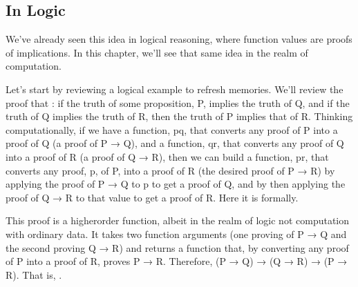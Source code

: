 \documentclass[letterpaper,10pt,english]{sphinxmanual}
\begin{document}
\subsection{In Logic}
\label{\detokenize{A_03_Recursive_Types:in-logic}}
\sphinxAtStartPar
We’ve already seen this idea in logical reasoning,
where function values are proofs of implications.
In this chapter, we’ll see that same idea in the
realm of computation.

\sphinxAtStartPar
Let’s start by reviewing a logical example to
refresh memories. We’ll review the proof that
: if the truth of some
proposition, P, implies the truth of Q, and if the
truth of Q implies the truth of R, then the truth
of P implies that of R. Thinking computationally,
if we have a function, pq, that converts any proof
of P into a proof of Q (a proof of P → Q), and a
function, qr, that converts any proof of Q into a
proof of R (a proof of Q → R), then we can build
a function, pr, that converts any proof, p, of P,
into a proof of R (the desired proof of P → R) by
applying the proof of P → Q to p to get a proof of
Q, and by then applying the proof of Q → R to that
value to get a proof of R. Here it is formally.

\begin{sphinxVerbatim}[commandchars=\\\{\}]
                  
     
        
    
\end{sphinxVerbatim}

\sphinxAtStartPar
This proof is a higher\sphinxhyphen{}order function, albeit in the
realm of logic not computation with ordinary data. It
takes two function arguments (one proving of P → Q and
the second proving Q → R) and returns a function that,
by converting any proof of P into a proof of R, proves
P → R. Therefore, (P → Q) → (Q → R) → (P → R). That is,
.
\end{document}
